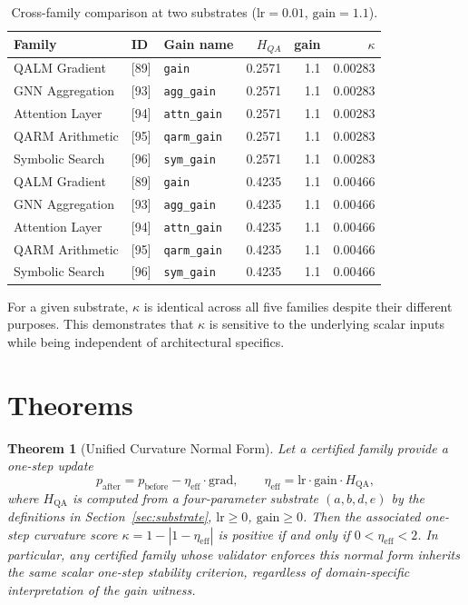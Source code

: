 \documentclass[11pt]{article}
\newtheorem{theorem}{Theorem}[section]
\theoremstyle{definition}
\theoremstyle{remark}
\newcommand{\hqa}{H_{\mathrm{QA}}}
\newcommand{\etaeff}{\eta_{\mathrm{eff}}}
\begin{document}
\begin{table}[h]
\centering
\caption{Cross-family comparison at two substrates ($\mathrm{lr}=0.01$, $\mathrm{gain}=1.1$).}
\label{tab:comparison}
\begin{tabular}{lllrrr}
\toprule
Family & ID & Gain name & $H_{QA}$ & gain & $\kappa$ \\
\midrule
QALM Gradient & [89] & \texttt{gain} & 0.2571 & 1.1 & 0.00283 \\
GNN Aggregation & [93] & \texttt{agg\_gain} & 0.2571 & 1.1 & 0.00283 \\
Attention Layer & [94] & \texttt{attn\_gain} & 0.2571 & 1.1 & 0.00283 \\
QARM Arithmetic & [95] & \texttt{qarm\_gain} & 0.2571 & 1.1 & 0.00283 \\
Symbolic Search & [96] & \texttt{sym\_gain} & 0.2571 & 1.1 & 0.00283 \\
\midrule
QALM Gradient & [89] & \texttt{gain} & 0.4235 & 1.1 & 0.00466 \\
GNN Aggregation & [93] & \texttt{agg\_gain} & 0.4235 & 1.1 & 0.00466 \\
Attention Layer & [94] & \texttt{attn\_gain} & 0.4235 & 1.1 & 0.00466 \\
QARM Arithmetic & [95] & \texttt{qarm\_gain} & 0.4235 & 1.1 & 0.00466 \\
Symbolic Search & [96] & \texttt{sym\_gain} & 0.4235 & 1.1 & 0.00466 \\
\bottomrule
\end{tabular}
\end{table}

For a given substrate, $\kappa$ is identical across all five families despite their
different purposes. This demonstrates that $\kappa$ is sensitive to the underlying
scalar inputs while being independent of architectural specifics.

\section{Theorems}
\label{sec:theorems}

\begin{theorem}[Unified Curvature Normal Form]
\label{thm:normal-form}
Let a certified family provide a one-step update
\[
  p_{\mathrm{after}} = p_{\mathrm{before}} - \etaeff\cdot\mathrm{grad},
  \qquad \etaeff=\mathrm{lr}\cdot\mathrm{gain}\cdot\hqa,
\]
where $\hqa$ is computed from a four-parameter substrate $(a,b,d,e)$ by the
definitions in Section~\ref{sec:substrate}, $\mathrm{lr}\geq 0$, $\mathrm{gain}\geq 0$.
Then the associated one-step curvature score $\kappa=1-|1-\etaeff|$ is positive if
and only if $0<\etaeff<2$. In particular, any certified family whose validator
enforces this normal form inherits the same scalar one-step stability criterion,
regardless of domain-specific interpretation of the gain witness.
\end{theorem}
\end{document}
